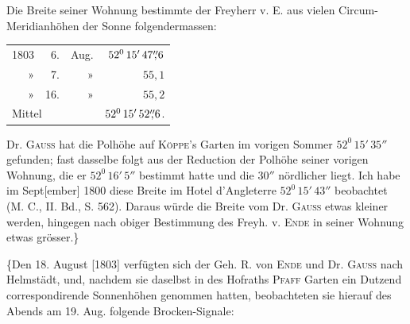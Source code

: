 \begingroup\raggedright Die Breite seiner Wohnung bestimmte der Freyherr v. E. aus vielen Circum-Meridianhöhen der Sonne folgendermassen:\par\endgroup
\clearpage{}
\begin{center}
\begin{tabular}{rrrr}
1803&6.&Aug.&$52^0\,15'\,47\mathord{\overset{\prime\prime}{,}}6$\\
»&7.&»&$55{,}1$\\
»&16.&»&$55{,}2$\\\hline
\multicolumn{3}{l}{Mittel}&$52^0\,15'\,52\mathord{\overset{\prime\prime}{,}}6$.
\end{tabular}
\end{center}
\noindent\hspace*{\parindent}Dr. \textsc{Gauss} hat die Polhöhe auf \textsc{Köppe}'s Garten im vorigen Sommer $52^0\,15'\,35''$ gefunden; fast dasselbe folgt aus der Reduction der Polhöhe seiner vorigen Wohnung, die er $52^0\,16'\,5''$ bestimmt hatte und die $30''$ nördlicher liegt. Ich habe im Sept[ember] 1800 diese Breite im Hotel d'Angleterre $52^0\,15'\,43''$ beobachtet (M. C., II. Bd., S. 562). Daraus würde die Breite vom Dr. \textsc{Gauss} etwas kleiner werden, hingegen nach obiger Bestimmung des Freyh. v. \textsc{Ende} in seiner Wohnung etwas grösser.\}
\begin{center}\end{center}
\noindent\hspace*{\parindent}\{Den 18. August [1803] verfügten sich der Geh. R. von \textsc{Ende} und Dr. \textsc{Gauss} nach Helmstädt, und, nachdem sie daselbst in des Hofraths \textsc{Pfaff} Garten ein Dutzend correspondirende Sonnenhöhen genommen hatten, beobachteten sie hierauf des Abends am 19. Aug. folgende Brocken-Signale:
